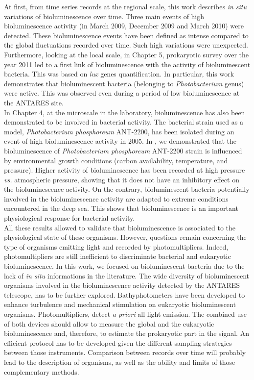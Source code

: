 At first, from time series records at the regional scale, this work describes \textit{in situ} variations of bioluminescence over time. Three main events of high bioluminescence activity (in March 2009, December 2009 and March 2010) were detected. These bioluminescence events have been defined as intense compared to the global fluctuations recorded over time. Such high variations were unexpected. \\

Furthermore, looking at the local scale, in Chapter 5, prokaryotic survey over the year 2011 led to a first link of bioluminescence with the activity of bioluminescent bacteria. This was based on \textit{lux} genes quantification. In particular, this work demonstrates that bioluminescent bacteria (belonging to \textit{Photobacterium} genus) were active. This was observed even during a period of low bioluminescence at the ANTARES site.\\ 

In Chapter 4, at the microscale in the laboratory, bioluminescence has also been demonstrated to be involved in bacterial activity. The bacterial strain used as a model, \textit{Photobacterium phosphoreum} ANT-2200, has been isolated during an event of high bioluminescence activity in 2005. In \cite{martini2013}, we demonstrated that the bioluminescence of \textit{Photobacterium phosphoreum} ANT-2200 strain is influenced by environmental growth conditions (carbon availability, temperature, and pressure). Higher activity of bioluminescence has been recorded at high pressure \textit{vs.} atmospheric pressure, showing that it does not have an inhibitory effect on the bioluminescence activity. On the contrary, bioluminescent bacteria potentially involved in the bioluminescence activity are adapted to extreme conditions encountered in the deep sea. This shows that bioluminescence is an important physiological response for bacterial activity.\\

All these results allowed to validate that bioluminescence is associated to the physiological state of these organisms. However, questions remain concerning the type of organisms emitting light and recorded by photomultipliers. Indeed, photomultipliers are still inefficient to discriminate bacterial and eukaryotic bioluminescence. In this work, we focused on bioluminescent bacteria due to the lack of \textit{in situ} informations in the literature. The wide diversity of bioluminescent organisms involved in the bioluminescence activity detected by the ANTARES telescope, has to be further explored. Bathyphotometers have been developed to enhance turbulence and mechanical stimulation on eukaryotic bioluminescent organisms. Photomultipliers, detect \textit{a priori} all light emission. The combined use of both devices should allow to measure the global and the eukaryotic bioluminescence and, therefore, to estimate the prokaryotic part in the signal. An efficient protocol has to be developed given the different sampling strategies between those instruments. Comparison between records over time will probably lead to the description of organisms, as well as the ability and limits of those complementary methods.\\

